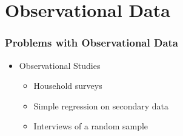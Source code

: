 \documentclass[xcolor=x11names,compress]{beamer}\usepackage[]{graphicx}\usepackage[]{color}
\renewcommand{\(}{\begin{columns}}
\renewcommand{\)}{\end{columns}}
\newcommand{\<}[1]{\begin{column}{#1}}
\renewcommand{\>}{\end{column}}
\begin{document}
\section{Observational Data}

\begin{frame}
\frametitle{Problems with Observational Data}
\begin{itemize}
\item Observational Studies
\pause
\begin{itemize}
\item Household surveys
\item Simple regression on secondary data
\item Interviews of a random sample
\end{itemize}
\end{itemize}
\end{frame}
\end{document}

